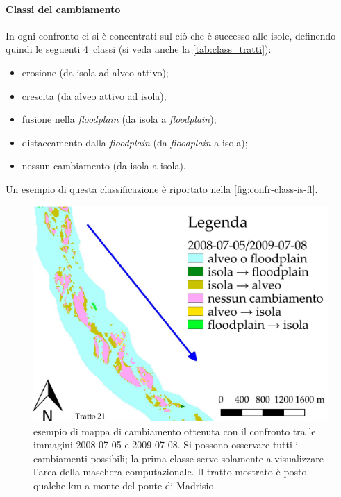 \paragraph{Classi del cambiamento}
In ogni confronto ci si è concentrati sul ciò che è successo alle isole, definendo quindi le seguenti 4~classi (si veda anche la \vref{tab:class_tratti}):
%
\begin{itemize}
	\item erosione (da isola ad alveo attivo);
	\item crescita (da alveo attivo ad isola);
	\item fusione nella \emph{floodplain} (da isola a \emph{floodplain});
	\item distaccamento dalla \emph{floodplain} (da \emph{floodplain} a isola);
	\item nessun cambiamento (da isola a isola).
\end{itemize}
%
Un esempio di questa classificazione è riportato nella \vref{fig:confr-class-is-fl}.
%
\begin{figure}
	\centering
	\includegraphics[width=.8\textwidth]{files/confr_class_is_fl.jpeg}
	\caption[esempio di mappa di cambiamento]{esempio di mappa di cambiamento ottenuta con il confronto tra le immagini \AST{} 2008-07-05 e 2009-07-08. Si possono osservare tutti i cambiamenti possibili; la prima classe serve solamente a visualizzare l'area della maschera computazionale. Il tratto mostrato è posto qualche \si{\kilo\m} a monte del ponte di Madrisio.}
	\label{fig:confr-class-is-fl}
\end{figure}
%


